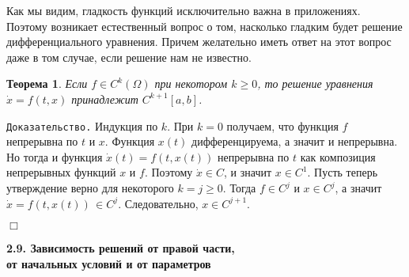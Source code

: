 \documentclass[12pt,a4paper]{article}
\newtheorem{theorem}{Теорема}
\begin{document}
 Как мы видим, гладкость функций исключительно важна в приложениях. Поэтому возникает естественный
 вопрос о том, насколько гладким будет решение дифференциального уравнения. Причем желательно иметь ответ на этот вопрос даже в том случае, если решение нам не известно.
 \begin{theorem}\label{th.smooth-sol}
 Если $f \in C^k(\Omega)$ при некотором $k \ge 0$, то решение уравнения $\dot x = f(t, x)$
 принадлежит $C^{k+1}[a, b]$.
 \end{theorem}
{\tt Доказательство.} Индукция по $k$. При $k=0$ получаем, что функция $f$ непрерывна по $t$ и $x$.
Функция $x(t)$ дифференцируема, а значит и непрерывна.
Но тогда и функция $\dot x (t) = f(t, x(t))$ непрерывна по $t$ как композиция непрерывных функций $x$ и $f$.
Поэтому $\dot x \in C$, и значит $x \in C^1$. Пусть теперь утверждение верно для некоторого
$k = j \ge 0$. Тогда $f \in C^j$ и $x \in C^j$, а значит $\dot x = f(t, x(t)) \, \in C^j$.
Следовательно, $x \in C^{j+1}$.

   {\hfill $\Box$}
\medskip


\medskip
\begin{center}
\textbf{2.9. Зависимость  решений от правой части, \\
от начальных условий и от параметров}
\end{center}
\medskip
\end{document}
